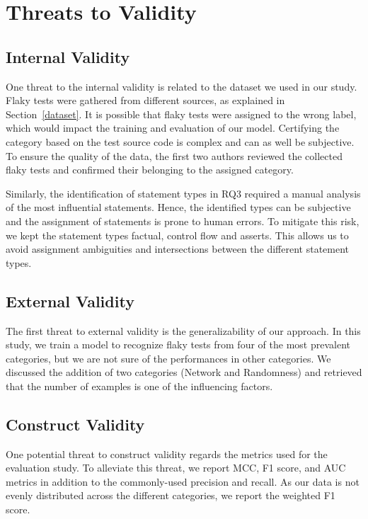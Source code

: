 \section{Threats to Validity}
\label{sec:flakycat-threats}

\subsection{Internal Validity}
One threat to the internal validity is related to the dataset we used in our study. Flaky tests were gathered from different sources, as explained in Section~\ref{dataset}. It is possible that flaky tests were assigned to the wrong label, which would impact the training and evaluation of our model. Certifying the category based on the test source code is complex and can as well be subjective. To ensure the quality of the data, the first two authors reviewed the collected flaky tests and confirmed their belonging to the assigned category.

Similarly, the identification of statement types in RQ3 required a manual analysis of the most influential statements. 
Hence, the identified types can be subjective and the assignment of statements is prone to human errors.
To mitigate this risk, we kept the statement types factual, \eg control flow and asserts.
This allows us to avoid assignment ambiguities and intersections between the different statement types.

\subsection{External Validity}
The first threat to external validity is the generalizability of our approach. In this study, we train a model to recognize flaky tests from four of the most prevalent categories, but we are not sure of the performances in other categories. We discussed the addition of two categories (Network and Randomness) and retrieved that the number of examples is one of the influencing factors. 

\subsection{Construct Validity}
One potential threat to construct validity regards the metrics used for the evaluation study. To alleviate this threat, we report MCC, F1 score, and AUC metrics in addition to the commonly-used precision and recall. As our data is not evenly distributed across the different categories, we report the weighted F1 score.
